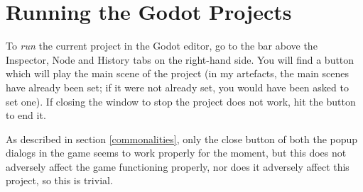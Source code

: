 \newpage

\section{Running the Godot Projects} \label{runproject}

To \textit{run} the current project in the Godot editor, go to the bar above the Inspector, Node and History tabs on the right-hand side. You will find a \faPlay{} button which will play the main scene of the project (in my artefacts, the main scenes have already been set; if it were not already set, you would have been asked to set one). If closing the window to stop the project does not work, hit the \faStop{} button to end it. 

As described in section \ref{commonalities}, only the close button of both the popup dialogs in the game seems to work properly for the moment, but this does not adversely affect the game functioning properly, nor does it adversely affect this project, so this is trivial.
